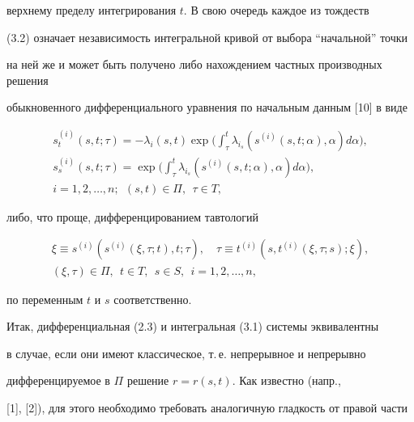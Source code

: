 верхнему пределу интегрирования $t$. В свою очередь каждое из тождеств 


(3.2) означает независимость интегральной кривой от выбора ``начальной'' точки


на ней же и может быть получено либо нахождением частных производных решения


обыкновенного дифференциального уравнения по начальным данным [10] в виде


\begin{gather*}


s^{(i)}_t (s,t;\tau)=- \lambda_i (s,t) \exp\bigg(\int_{\tau}^t \lambda_{i_s}


(s^{(i)}(s,t; \alpha), \alpha) d\alpha\bigg), \\


%


s^{(i)}_s (s,t;\tau)=\exp\bigg(\int_{\tau}^t \lambda_{i_s}


(s^{(i)}(s,t; \alpha), \alpha) d\alpha\bigg), \\


%


i=1,2,\dotsc,n;\ \ (s,t) \in {\Pi},\ \ \tau \in T,


\end{gather*}


либо, что проще, дифференцированием тавтологий


\begin{gather*}


\xi \equiv s^{(i)}(s^{(i)}(\xi, \tau;t),t;\tau),\quad


\tau \equiv t^{(i)}(s,t^{(i)}(\xi, \tau;s);\xi),\\


%


(\xi,\tau) \in {\Pi},\ \ t \in T,\ \ s \in S,\ \ i=1,2,\dotsc,n,


\end{gather*}


по переменным $t$ и $s$ соответственно.





Итак, дифференциальная (2.3) и интегральная (3.1) системы эквивалентны 


в случае, если они имеют классическое, т.\,е. непрерывное и непрерывно


дифференцируемое в $\Pi$ решение $r=r(s,t)$. Как известно (напр.,


[1], [2]), для этого необходимо требовать аналогичную гладкость от правой части 


